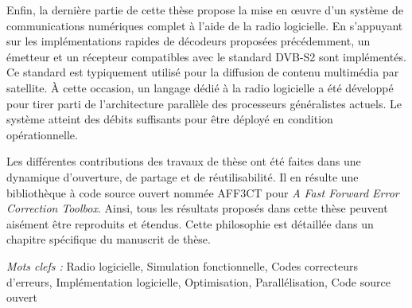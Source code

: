 Enfin, la dernière partie de cette thèse propose la mise en œuvre d'un système
de communications numériques complet à l'aide de la radio logicielle. En
s’appuyant sur les implémentations rapides de décodeurs proposées précédemment,
un émetteur et un récepteur compatibles avec le standard DVB-S2 sont
implémentés. Ce standard est typiquement utilisé pour la diffusion de contenu
multimédia par satellite. À cette occasion, un langage dédié à la radio
logicielle a été développé pour tirer parti de l'architecture parallèle des
processeurs généralistes actuels. Le système atteint des débits suffisants pour
être déployé en condition opérationnelle.

Les différentes contributions des travaux de thèse ont été faites dans une
dynamique d'ouverture, de partage et de réutilisabilité. Il en résulte une
bibliothèque à code source ouvert nommée AFF3CT pour \emph{A Fast Forward Error
Correction Toolbox}. Ainsi, tous les résultats proposés dans cette thèse peuvent
aisément être reproduits et étendus. Cette philosophie est détaillée dans un
chapitre spécifique du manuscrit de thèse.

\vskip0.5cm
\emph{Mots clefs :} Radio logicielle, Simulation fonctionnelle, Codes
                    correcteurs d'erreurs, Implémentation logicielle,
                    Optimisation, Parallélisation, Code source ouvert
